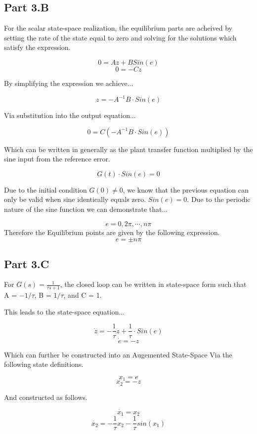 \documentclass[12px]{article}
\begin{document}
    \subsection{Part 3.B}

    For the scalar state-space realization, the equilibrium parts are acheived by setting the rate of the state equal to zero and solving for the solutions which satisfy the expression.

    $$ 0 = Az + BSin(e)$$
    $$ 0 = -Cz $$

    By simplifying the expression we achieve...

    $$ z = -A^{-1}B \cdot Sin(e)$$

    Via substitution into the output equation...

    $$ 0 = C \left( -A^{-1}B \cdot Sin(e) \right) $$

    Which can be written in generally as the plant transfer function multiplied by the sine input from the reference error.

    $$ G(t) \cdot Sin(e) = 0 $$

    Due to the initial condition $G(0) \neq 0 $, we know that the previous equation can only be valid when sine identically equals zero. $ Sin(e) = 0 $. Due to the periodic nature of the sine function we can demonstrate that...

    $$ e = 0, 2\pi, \cdots, n\pi $$
    Therefore the Equilibrium points are given by the following expression.
    $$ e = \pm n \pi$$


    \subsection{Part 3.C}

    For $G(s) = \frac{1}{\tau s + 1}$, the closed loop can be written in state-space form such that A = $-1/\tau$, B = $1/\tau$, and C = 1.

    This leads to the state-space equation...

    $$ \dot{z} = -\frac{1}{\tau}z + \frac{1}{\tau} \cdot Sin(e)  $$
    $$ \dot{e} = -z $$

    Which can further be constructed into an Augemented State-Space Via the following state definitions.

    $$ x_{1} = e $$
    $$ x_{2} = -z $$

    And constructed as follows.

    $$ \dot{x_1} = x_{2} $$
    $$ \dot{x_2} = - \frac{1}{\tau} x_2 - \frac{1}{\tau} sin(x_1)$$
\end{document}
